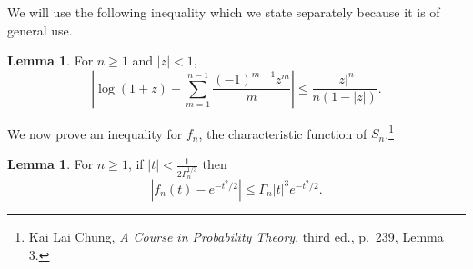 \documentclass{article}
\theoremstyle{definition}
\newtheorem{lemma}[theorem]{Lemma}
\theoremstyle{definition}
\begin{document}
We will use the following inequality which we state separately
because it is of general use.

\begin{lemma}
For $n \geq 1$ and $|z|<1$,
\[
\left| \log(1+z) - \sum_{m=1}^{n-1} \frac{(-1)^{m-1} z^m}{m} \right| \leq \frac{|z|^n}{n(1-|z|)}.
\]
\label{logarithm}
\end{lemma}

We now prove an inequality for $f_n$, the characteristic function of $S_n$.\footnote{Kai Lai Chung,
{\em A Course in Probability Theory}, third ed., p.~239, Lemma 3.}

\begin{lemma}
For $n \geq 1$, if $|t| < \frac{1}{2\Gamma_n^{1/3}}$ then
\[
|f_n(t)-e^{-t^2/2}| \leq \Gamma_n|t|^3 e^{-t^2/2}.
\]
\label{Gamma1}
\end{lemma}
\end{document}

